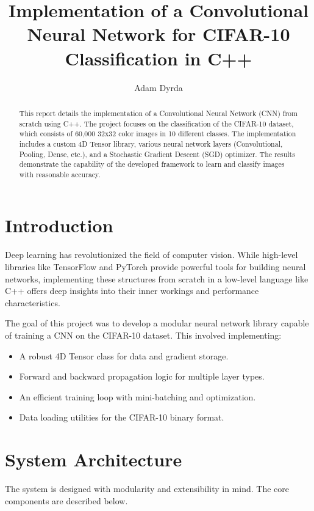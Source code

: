 \documentclass[11pt, a4paper]{article}
\title{\textbf{Implementation of a Convolutional Neural Network for CIFAR-10 Classification in C++}}
\author{Adam Dyrda}
\begin{document}
\maketitle

\begin{abstract}
This report details the implementation of a Convolutional Neural Network (CNN) from scratch using C++. The project focuses on the classification of the CIFAR-10 dataset, which consists of 60,000 32x32 color images in 10 different classes. The implementation includes a custom 4D Tensor library, various neural network layers (Convolutional, Pooling, Dense, etc.), and a Stochastic Gradient Descent (SGD) optimizer. The results demonstrate the capability of the developed framework to learn and classify images with reasonable accuracy.
\end{abstract}

\tableofcontents
\newpage

\section{Introduction}
Deep learning has revolutionized the field of computer vision. While high-level libraries like TensorFlow and PyTorch provide powerful tools for building neural networks, implementing these structures from scratch in a low-level language like C++ offers deep insights into their inner workings and performance characteristics.

The goal of this project was to develop a modular neural network library capable of training a CNN on the CIFAR-10 dataset. This involved implementing:
\begin{itemize}
    \item A robust 4D Tensor class for data and gradient storage.
    \item Forward and backward propagation logic for multiple layer types.
    \item An efficient training loop with mini-batching and optimization.
    \item Data loading utilities for the CIFAR-10 binary format.
\end{itemize}

\section{System Architecture}
The system is designed with modularity and extensibility in mind. The core components are described below.
\end{document}
